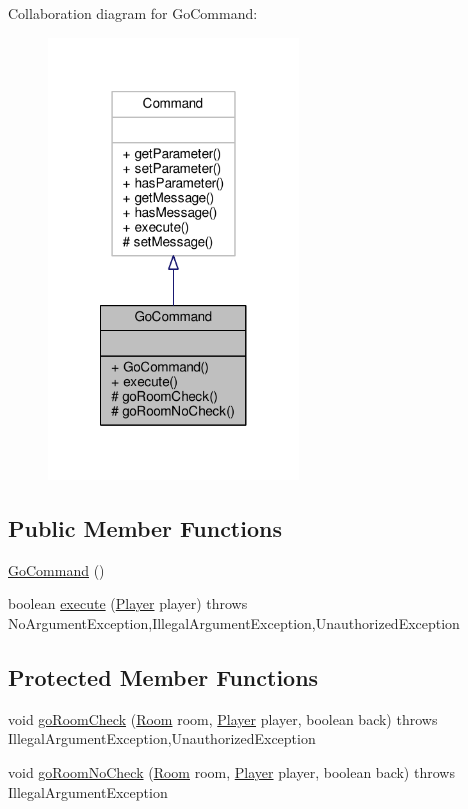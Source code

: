 Collaboration diagram for Go\-Command\-:
\nopagebreak
\begin{figure}[H]
\begin{center}
\leavevmode
\includegraphics[width=188pt]{classGoCommand__coll__graph}
\end{center}
\end{figure}
\subsection*{Public Member Functions}
\begin{DoxyCompactItemize}
\item 
\hyperlink{classGoCommand_a30d6bd5c2284b97e76ebe702e1cb1d55}{Go\-Command} ()
\item 
boolean \hyperlink{classGoCommand_a77a61c2a3b89dca45b51e06f3bcb3ba7}{execute} (\hyperlink{classPlayer}{Player} player)  throws No\-Argument\-Exception,\-Illegal\-Argument\-Exception,\-Unauthorized\-Exception 
\end{DoxyCompactItemize}
\subsection*{Protected Member Functions}
\begin{DoxyCompactItemize}
\item 
void \hyperlink{classGoCommand_a1fce2ad8ed1faf41fa300064585b3616}{go\-Room\-Check} (\hyperlink{classRoom}{Room} room, \hyperlink{classPlayer}{Player} player, boolean back)  throws Illegal\-Argument\-Exception,\-Unauthorized\-Exception 
\item 
void \hyperlink{classGoCommand_a3149bf695c19b78c39cfc4dadece7846}{go\-Room\-No\-Check} (\hyperlink{classRoom}{Room} room, \hyperlink{classPlayer}{Player} player, boolean back)  throws Illegal\-Argument\-Exception 
\end{DoxyCompactItemize}


